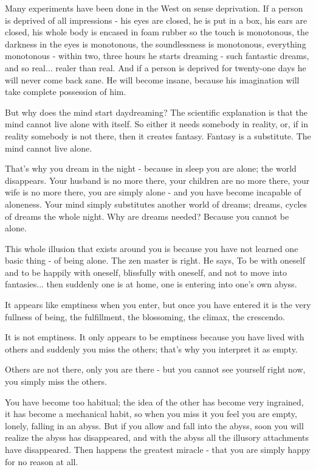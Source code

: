 Many experiments have been done in the West on sense deprivation. If a person is deprived of all impressions - his eyes are closed, he is put in a box, his ears are closed, his whole body is encased in foam rubber so the touch is monotonous, the darkness in the eyes is monotonous, the soundlessness is monotonous, everything monotonous - within two, three hours he starts dreaming - such fantastic dreams, and so real... realer than real. And if a person is deprived for twenty-one days he will never come back sane. He will become insane, because his imagination will take complete possession of him. 

But why does the mind start daydreaming? The scientific explanation is that the mind cannot live alone with itself. So either it needs somebody in reality, or, if in reality somebody is not there, then it creates fantasy. Fantasy is a substitute. The mind cannot live alone. 

That's why you dream in the night - because in sleep you are alone; the world disappears. Your husband is no more there, your children are no more there, your wife is no more there, you are simply alone - and you have become incapable of aloneness. Your mind simply substitutes another world of dreams; dreams, cycles of dreams the whole night. Why are dreams needed? Because you cannot be alone. 

This whole illusion that exists around you is because you have not learned one basic thing - of being alone. The zen master is right. He says,  To be with oneself and to be happily with oneself, blissfully with oneself, and not to move into fantasies... then suddenly one is at home, one is entering into one's own abyss. 

It appears like emptiness when you enter, but once you have entered it is the very fullness of being, the fulfillment, the blossoming, the climax, the crescendo. 

It is not emptiness. It only appears to be emptiness because you have lived with others and suddenly you miss the others; that's why you interpret it as empty. 

Others are not there, only you are there - but you cannot see yourself right now, you simply miss the others. 

You have become too habitual; the idea of the other has become very ingrained, it has become a mechanical habit, so when you miss it you feel you are empty, lonely, falling in an abyss. But if you allow and fall into the abyss, soon you will realize the abyss has disappeared, and with the abyss all the illusory attachments have disappeared. Then happens the greatest miracle - that you are simply happy for no reason at all. 

